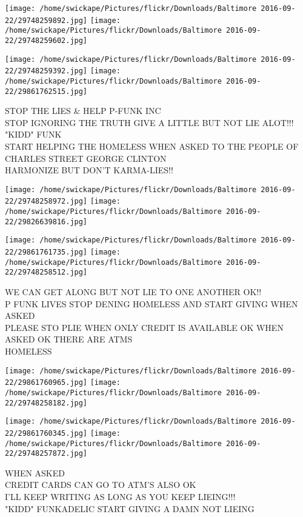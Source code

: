 \documentclass[10pt,letterpaper]{article}
\begin{document}
\texttt{[image: /home/swickape/Pictures/flickr/Downloads/Baltimore 2016-09-22/29748259892.jpg]}
\texttt{[image: /home/swickape/Pictures/flickr/Downloads/Baltimore 2016-09-22/29748259602.jpg]}

\texttt{[image: /home/swickape/Pictures/flickr/Downloads/Baltimore 2016-09-22/29748259392.jpg]}
\texttt{[image: /home/swickape/Pictures/flickr/Downloads/Baltimore 2016-09-22/29861762515.jpg]}

STOP THE LIES \& HELP P{-}FUNK INC\\
STOP IGNORING THE TRUTH GIVE A LITTLE BUT NOT LIE ALOT!!! "KIDD" FUNK\\
START HELPING THE HOMELESS WHEN ASKED TO THE PEOPLE OF CHARLES STREET GEORGE CLINTON\\
HARMONIZE BUT DON'T KARMA{-}LIES!!
\pagebreak

\texttt{[image: /home/swickape/Pictures/flickr/Downloads/Baltimore 2016-09-22/29748258972.jpg]}
\texttt{[image: /home/swickape/Pictures/flickr/Downloads/Baltimore 2016-09-22/29826639816.jpg]}

\texttt{[image: /home/swickape/Pictures/flickr/Downloads/Baltimore 2016-09-22/29861761735.jpg]}
\texttt{[image: /home/swickape/Pictures/flickr/Downloads/Baltimore 2016-09-22/29748258512.jpg]}

WE CAN GET ALONG BUT NOT LIE TO ONE ANOTHER OK!!\\
P FUNK LIVES STOP DENING HOMELESS AND START GIVING WHEN ASKED\\
PLEASE STO PLIE WHEN ONLY CREDIT IS AVAILABLE OK WHEN ASKED OK THERE ARE ATMS\\
HOMELESS
\pagebreak

\texttt{[image: /home/swickape/Pictures/flickr/Downloads/Baltimore 2016-09-22/29861760965.jpg]}
\texttt{[image: /home/swickape/Pictures/flickr/Downloads/Baltimore 2016-09-22/29748258182.jpg]}

\texttt{[image: /home/swickape/Pictures/flickr/Downloads/Baltimore 2016-09-22/29861760345.jpg]}
\texttt{[image: /home/swickape/Pictures/flickr/Downloads/Baltimore 2016-09-22/29748257872.jpg]}

WHEN ASKED\\
CREDIT CARDS CAN GO TO ATM'S ALSO OK\\
I'LL KEEP WRITING AS LONG AS YOU KEEP LIEING!!!\\
"KIDD" FUNKADELIC START GIVING A DAMN NOT LIEING
\pagebreak
\end{document}
